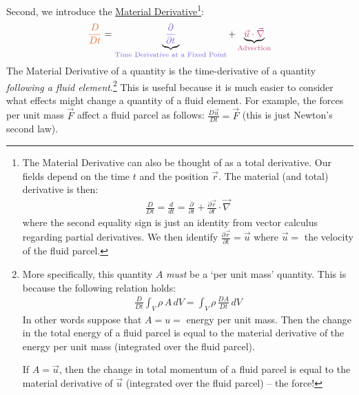Second, we introduce the \hyperref[Material Derivative]{Material Derivative}\footnote{
    The Material Derivative can also be thought of as a total derivative. Our fields depend on the time \(t\) and the position \(\vec{r}\). The material (and total) derivative is then:
    \begin{align*}
        \frac{D}{Dt} = \frac{d}{dt} 
        = 
        \frac{\partial}{\partial t}
        +
        \frac{\partial \vec{r}}{\partial t}
        \cdot
        \vec{\nabla}
    \end{align*}
    where the second equality sign is just an identity from vector calculus regarding partial derivatives. We then identify \(\frac{\partial \vec{r}}{\partial t}=\vec{u}\) where \(\vec{u}=\) the velocity of the fluid parcel.
}:
\begin{align}
    \textcolor{myorange}{\frac{D}{Dt}}
    =
    \underbrace{
        \textcolor{mydarkblue}{\frac{\partial}{\partial t}}
        }_{\textcolor{mydarkblue}{\text{Time Derivative at a Fixed Point}}}+
        \underbrace{
            \textcolor{mymagenta}{\vec{u}\cdot\vec{\nabla}}}_{\textcolor{mymagenta}{\text{Advection}}}
    \label{Material Derivative}
\end{align}
The Material Derivative of a quantity is the time-derivative of a quantity \textit{following a fluid element}.\footnote{
    More specifically, this quantity \(A\) \textit{must} be a `per unit mass' quantity. This is because the following relation holds:
    \begin{align*}
        \frac{D}{Dt}\int_V \rho\,A \, dV = \int_V \rho \,\frac{DA}{Dt} \, dV
    \end{align*}
    In other words suppose that \(A=u=\) energy per unit mass. Then the change in the total energy of a fluid parcel is equal to the material derivative of the energy per unit mass (integrated over the fluid parcel).

    If \(A=\vec{u}\), then the change in total momentum of a fluid parcel is equal to the material derivative of \(\vec{u}\) (integrated over the fluid parcel) -- the force!
} This is useful because it is much easier to consider what effects might change a quantity of a fluid element. For example, the forces per unit mass \(\vec{F}\) affect a fluid parcel as follows: \(\frac{D\vec{u}}{Dt}=\vec{F}\) (this is just Newton's second law).

